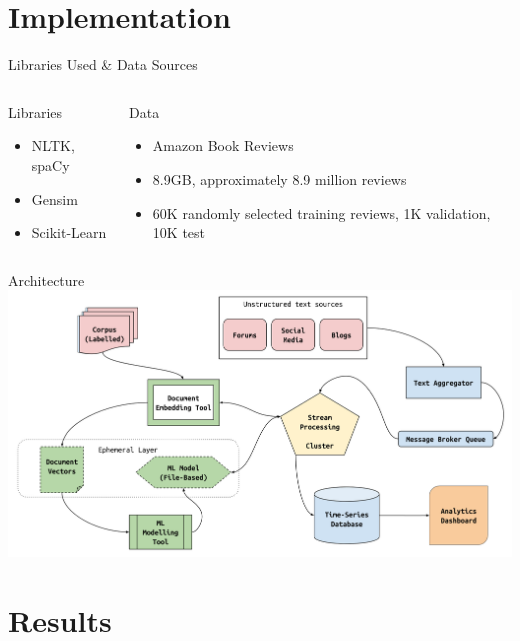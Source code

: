 \documentclass[aspectratio=169]{beamer}
\begin{document}
\section{Implementation}

\begin{frame}{Libraries Used \& Data Sources}
	\begin{columns}[T] %
		\begin{column}{.3\textwidth}
			{\Large Libraries}
			\begin{itemize}
				\item NLTK, spaCy
				\item Gensim
				\item Scikit-Learn
			\end{itemize}
		\end{column}
		\hfill
		\begin{column}{.6\textwidth}
			{\Large Data}
			\begin{itemize}
				\item Amazon Book Reviews
				\item 8.9GB, approximately 8.9 million reviews
				\item 60K randomly selected training reviews, 1K validation, 10K test
			\end{itemize}
		\end{column}
	\end{columns}
\end{frame}

\begin{frame}{Architecture}
	\centering
	\includegraphics[width=.9\textwidth]{images/rapid-rate-system-arch.png}
\end{frame}


\section{Results}
\end{document}
